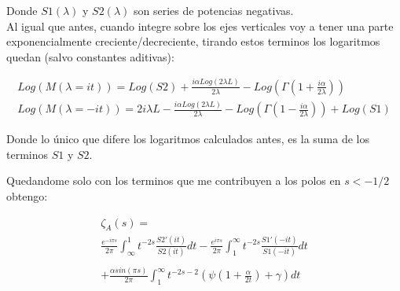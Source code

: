 Donde $S1 (\lambda ) $ y $S2 (\lambda)$ son series de potencias negativas.  \\

Al igual que antes, cuando integre sobre los ejes verticales voy a tener una parte exponencialmente creciente/decreciente, tirando estos terminos los logaritmos quedan (salvo constantes aditivas):

\begin{equation}
\begin{array}{c}

Log ( M ( \lambda = i t ) ) =  Log(S2) + 
\frac{i \alpha Log(2 \lambda L)}{2 \lambda} - Log( \Gamma( 1 + \frac{i \alpha}{2 \lambda} ) ) \\

Log( M ( \lambda = -i t ) ) = 2 i \lambda L - \frac{i \alpha Log( 2 \lambda L )}{2 \lambda} - 
Log( \Gamma ( 1 - \frac{i \alpha}{2 \lambda} )) + Log(S1)

\end{array}
\end{equation}

Donde lo único que difere los logaritmos calculados antes, es la suma de los terminos $S1$ y $S2$.

Quedandome solo con los terminos que me contribuyen a los polos en  $s < -1/2$ obtengo:

\begin{equation}
\begin{array}{c}
 \zeta _A (s) = \\
\frac{e ^{- i \pi s}}{2 \pi}
\int _{\infty} ^{1} t ^{-2s } 
		\frac{S2' (it)}{S2 (it)}
		d t
	- 
\frac{e ^{i \pi s}}{2 \pi}
\int _{1} ^{\infty} t ^{-2s } 
	\frac{S1' (-it)}{S1(-it)}
	d t
	 \\ \\
	+ \frac{\alpha sin( \pi s)}{2 \pi }	 \int _1 ^{\infty}
	t ^{-2s-2} \left( \psi \left( 1 + \frac{\alpha}{2 t}\right) + \gamma \right) dt


\end{array}
\end{equation}

\begin{comment}
\begin{equation}
\frac{1 }{2 \pi i}
\int _{circulo} \lambda ^{-2s } \partial \lambda \ Log \left[
					\frac{e ^{\frac{i \alpha Log( 2 \lambda L )}{2 \lambda}} e ^{2 i \lambda L} S1}
					{\Gamma \left( 1 - \frac{i \alpha}{2 \lambda} \right)} - 
					\frac{e ^{\frac{-i \alpha Log(2 \lambda L )}{2 \lambda}} S2}
					{\Gamma \left( 1 + \frac{i \alpha}{2 \lambda} \right)}					
					\right] d \lambda
\end{equation}
\end{comment}

